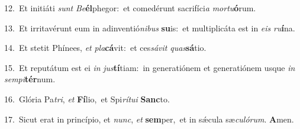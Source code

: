 {\numbfont\textcolor{\numbcolor}{12.}}~Et initiáti \textit{sunt} \textit{Be}\-\textbf{él}phegor:~\star et comedérunt sacrifíci\textit{a} \textit{mor}\-\textit{tu}\textbf{ó}rum.\par
{\numbfont\textcolor{\numbcolor}{13.}}~Et irritavérunt eum in adinventió\-\textit{ni}\-\textit{bus} \textbf{su}\-is:~\star et multiplicáta est in \textit{e}\-\textit{is} \textit{ru}\-\textbf{í}na.\par
{\numbfont\textcolor{\numbcolor}{14.}}~Et stetit Phínees, \textit{et} \textit{pla}\-\textbf{cá}vit:~\star et ces\-\textit{sá}\-\textit{vit} \textit{quas}\-\textbf{sá}tio.\par
{\numbfont\textcolor{\numbcolor}{15.}}~Et reputátum est ei \textit{in} \textit{jus}\-\textbf{tí}tiam:~\star in generatiónem et generatiónem usque \textit{in} \textit{sem}\-\textit{pi}\textbf{tér}num.\par
{\numbfont\textcolor{\numbcolor}{16.}}~Glória Pa\-\textit{tri}\-, \textit{et} \textbf{Fí}\-lio,~\star et Spi\-\textit{rí}\-\textit{tu}\textit{i} \textbf{Sanc}\-to.\par
{\numbfont\textcolor{\numbcolor}{17.}}~Sicut erat in princípio, et \textit{nunc}\-, \textit{et} \textbf{sem}\-per,~\star et in sǽcula sæ\-\textit{cu}\-\textit{ló}\textit{rum}. \textbf{A}\-men.\par
